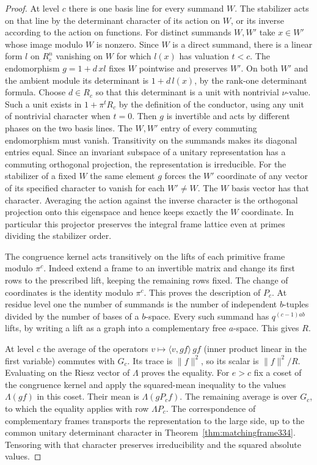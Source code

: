 \documentclass[a4paper,11pt]{article}
\theoremstyle{definition}
\theoremstyle{remark}
\numberwithin{equation}{section}
\begin{document}
\begin{proof}
At level \(c\) there is one basis line for every summand \(W\).
The stabilizer acts on that line by the determinant character of its
action on \(W\), or its inverse according to the action on functions.
For distinct summands \(W,W'\) take \(x\in W'\) whose image modulo
\(W\) is nonzero. Since \(W\) is a direct summand, there is a linear
form \(l\) on \(R_c^n\) vanishing on \(W\) for which \(l(x)\) has
valuation \(t<c\). The endomorphism \(g=1+d\,x l\) fixes \(W\)
pointwise and preserves \(W'\). On both \(W'\) and the ambient module
its determinant is \(1+d\,l(x)\), by the rank-one determinant formula.
Choose \(d\in R_c\) so that this determinant is a unit with nontrivial
\(\nu\)-value. Such a unit exists in \(1+\pi^tR_c\) by the definition
of the conductor, using any unit of nontrivial character when \(t=0\).
Then \(g\) is invertible and acts by different phases on the two
basis lines. The \(W,W'\) entry of every commuting endomorphism
must vanish. Transitivity on the summands makes its diagonal entries
equal. Since an invariant subspace of a unitary representation has
a commuting orthogonal projection, the representation is irreducible.
For the stabilizer of a fixed \(W\) the same element \(g\) forces
the \(W'\) coordinate of any vector of its specified character to vanish
for each \(W'\ne W\). The \(W\) basis vector has that character.
Averaging the action against the inverse character is the orthogonal
projection onto this eigenspace and hence keeps exactly the \(W\)
coordinate. In particular this projector preserves the integral frame
lattice even at primes dividing the stabilizer order.

The congruence kernel acts transitively on the lifts of each primitive
frame modulo \(\pi^c\). Indeed extend a frame to an invertible matrix
and change its first rows to the prescribed lift, keeping the remaining
rows fixed. The change of coordinates is the identity modulo \(\pi^c\).
This proves the description of \(P_c\). At residue level one the number
of summands is the number of independent \(b\)-tuples divided by
the number of bases of a \(b\)-space. Every such summand has
\(q^{(c-1)ab}\) lifts, by writing a lift as a graph into a complementary
free \(a\)-space. This gives \(R\).

At level \(c\) the average of the operators
\(v\mapsto\langle v,g f\rangle\,g f\) (inner product linear in the
first variable) commutes with \(G_c\). Its trace is \(\|f\|^2\),
so its scalar is \(\|f\|^2/R\). Evaluating on the Riesz vector of
\(\Lambda\) proves the equality. For \(e>c\) fix a coset of the
congruence kernel and apply the squared-mean inequality to the values
\(\Lambda(g f)\) in this coset. Their mean is \(\Lambda(gP_cf)\).
The remaining average is over \(G_c\), to which the equality applies
with row \(\Lambda P_c\). The correspondence of complementary frames
transports the representation to the large side, up to the common
unitary determinant character in Theorem~\ref{thm:matchingframe334}.
Tensoring with that character preserves irreducibility and the squared
absolute values.
\end{proof}
\end{document}
